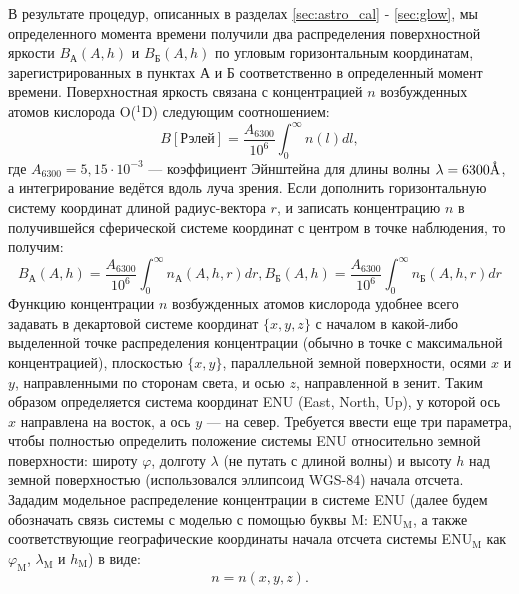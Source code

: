 \documentclass[12pt,a4paper]{article}
\newcommand{\angstrom}{\textup{\AA}}
\begin{document}
 В результате процедур, описанных в разделах \ref{sec:astro_cal} - \ref{sec:glow}, мы определенного момента времени получили два распределения поверхностной яркости $B_\text{А} (A,h)$ и $B_\text{Б} (A,h)$ по угловым горизонтальным координатам, зарегистрированных в пунктах А и Б соответственно в определенный момент времени. Поверхностная яркость связана с концентрацией $n$ возбужденных атомов кислорода O($^1$D) следующим соотношением:
 \begin{equation}\label{eq:mod1}
 B [\text{Рэлей}] = \frac{A_{6300}}{10^6}\int_0^\infty n(l)dl,
 \end{equation}
где 
$A_{6300}=5,15\cdot10^{-3}$ %
 \cite{Gustavsson2008} --- коэффициент Эйнштейна для длины волны $\lambda = 6300\angstrom$, а интегрирование ведётся вдоль луча зрения. Если дополнить горизонтальную систему координат длиной радиус-вектора $r$, и записать концентрацию $n$ в получившейся сферической системе координат с центром в точке наблюдения, то получим:
\begin{equation}\label{eq:mod2}
 B_\text{А} (A,h) = \frac{A_{6300}}{10^6}\int_0^\infty n_\text{А}(A,h,r)dr,
 B_\text{Б} (A,h) = \frac{A_{6300}}{10^6}\int_0^\infty n_\text{Б}(A,h,r)dr
\end{equation}
Функцию концентрации $n$ возбужденных атомов кислорода удобнее всего задавать в декартовой системе координат $\{x,y,z\}$ с началом в какой-либо выделенной точке распределения концентрации (обычно в точке с максимальной концентрацией), плоскостью $\{x,y\}$, параллельной земной поверхности, осями $x$ и $y$, направленными по сторонам света, и осью $z$, направленной в зенит. Таким образом определяется система координат ENU (East, North, Up), у которой ось $x$ направлена на восток, а ось $y$ --- на север. Требуется ввести еще три параметра, чтобы полностью определить положение системы ENU относительно земной поверхности: широту $\varphi$, долготу $\lambda$ (не путать с длиной волны) и высоту $h$ над земной поверхностью (использовался эллипсоид WGS-84) начала отсчета. Зададим модельное распределение концентрации в системе ENU (далее будем обозначать связь системы с моделью с помощью буквы M: ENU$_\text{M}$, а также соответствующие географические координаты начала отсчета системы ENU$_\text{M}$ как $\varphi_\text{M}$, $\lambda_\text{M}$ и $h_\text{M}$) в виде:
\begin{equation}\label{eq:mod3}
n=n(x,y,z).
\end{equation}
\end{document}

